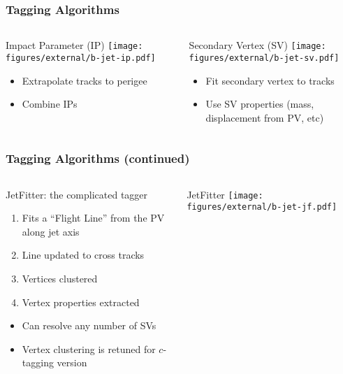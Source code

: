\documentclass[usenames,dvipsnames]{beamer}
\begin{document}
\begin{frame}
  \frametitle{Tagging Algorithms}
  \begin{columns}[t]
    \begin{column}{0.5\textwidth}
      \begin{center}
        Impact Parameter (IP)
      \texttt{[image: figures/external/b-jet-ip.pdf]}
      \end{center}
      \begin{itemize}
      \item Extrapolate tracks to perigee
      \item Combine IPs
      \end{itemize}
    \end{column}
    \vline{}
    \begin{column}{0.5\textwidth}
      \begin{center}
        Secondary Vertex (SV)
      \texttt{[image: figures/external/b-jet-sv.pdf]}
        \end{center}
      \begin{itemize}
      \item Fit secondary vertex to tracks
      \item Use SV properties (mass, displacement from PV, etc)
      \end{itemize}
    \end{column}
  \end{columns}
\end{frame}

\begin{frame}
  \frametitle{Tagging Algorithms (continued)}
  \begin{columns}
    \begin{column}{0.5\textwidth}
      JetFitter: the complicated tagger
      \begin{enumerate}
      \item Fits a ``Flight Line'' from the PV along jet axis
      \item Line updated to cross tracks
      \item Vertices clustered
      \item Vertex properties extracted
      \end{enumerate}
      \begin{itemize}
      \item Can resolve any number of SVs
      \item Vertex clustering is retuned for $c$-tagging version
      \end{itemize}
    \end{column}
    \begin{column}{0.5\textwidth}
        \begin{center}
          JetFitter
      \texttt{[image: figures/external/b-jet-jf.pdf]}
        \end{center}
    \end{column}
  \end{columns}
\end{frame}
\end{document}
